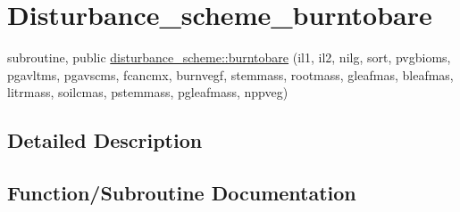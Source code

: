 \hypertarget{group__disturbance__scheme__burntobare}{}\section{Disturbance\+\_\+scheme\+\_\+burntobare}
\label{group__disturbance__scheme__burntobare}
\begin{DoxyCompactItemize}
\item 
subroutine, public \hyperlink{group__disturbance__scheme__burntobare_gae72fa0c94541c3e88a45d71f2442be9c}{disturbance\+\_\+scheme\+::burntobare} (il1, il2, nilg, sort, pvgbioms, pgavltms, pgavscms, fcancmx, burnvegf, stemmass, rootmass, gleafmas, bleafmas, litrmass, soilcmas, pstemmass, pgleafmass, nppveg)
\end{DoxyCompactItemize}


\subsection{Detailed Description}


\subsection{Function/\+Subroutine Documentation}
\hypertarget{group__disturbance__scheme__burntobare_gae72fa0c94541c3e88a45d71f2442be9c}{}
